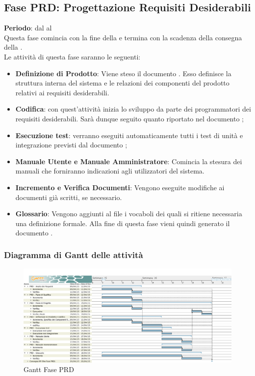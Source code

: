 \subsection{Fase PRD: Progettazione Requisiti Desiderabili}
	\textbf{Periodo}: dal  al  \\Questa fase comincia con la fine della  e termina con la scadenza della consegna della .\\Le attività di questa fase saranno le seguenti:
	\begin{itemize}
		\item\textbf{Definizione di Prodotto}: Viene steso il documento . Esso definisce la struttura interna del sistema e le relazioni dei componenti del prodotto relativi ai requisiti desiderabili.
		\item \textbf{Codifica}: con quest'attività inizia lo sviluppo da parte dei programmatori dei requisiti desiderabili. Sarà dunque seguito quanto riportato nel documento ;
		\item \textbf{Esecuzione test}: verranno eseguiti automaticamente tutti i test di unità e integrazione previsti dal documento ;
		\item\textbf{Manuale Utente e Manuale Amministratore}: Comincia la stesura dei manuali che forniranno indicazioni agli utilizzatori del sistema.
		\item\textbf{Incremento e Verifica Documenti}: Vengono eseguite modifiche ai documenti già scritti, se necessario.
		\item\textbf{Glossario}: Vengono aggiunti al file  i vocaboli dei quali si ritiene necessaria una definizione formale. Alla fine di questa fase vieni quindi generato il documento .
	\end{itemize}
	\subsubsection{Diagramma di Gantt delle attività}
	\begin{figure}[H]\centering
		\includegraphics[width=\textwidth]{PianoDiProgetto/Pics/FasePRD.png}
	\caption{Gantt Fase PRD}
\end{figure}